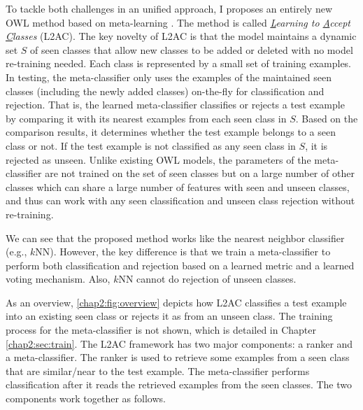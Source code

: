 To tackle both challenges in an unified approach, I proposes an entirely new OWL method based on meta-learning \cite{thrun2012learning,andrychowicz2016learning,fernando2017pathnet,finn2017model,finn2018probabilistic}. The method is called \textit{\underline{L}earning to \underline{A}ccept \underline{C}lasses} (L2AC). The key novelty of L2AC is that the model maintains a dynamic set $S$ of seen classes that allow new classes to be added or deleted with no model re-training needed. Each class is represented by a small set of training examples. In testing, the meta-classifier only uses the examples of the maintained seen classes (including the newly added classes) on-the-fly for classification and rejection. That is, the learned meta-classifier classifies or rejects a test example by comparing it with its nearest examples from each seen class in $S$. Based on the comparison results, it determines whether the test example belongs to a seen class or not. If the test example is not classified as any seen class in $S$, it is rejected as unseen. Unlike existing OWL models, 
the parameters of the meta-classifier are not trained on the set of seen classes but on a large number of other classes which can share a large number of features with seen and unseen classes, and thus can work with any seen classification and unseen class rejection without re-training. 

We can see that the proposed method works like the nearest neighbor classifier (e.g., $k$NN). However, the key difference is that we train a meta-classifier to perform both classification and rejection based on a learned metric and a learned voting mechanism. Also, 
$k$NN cannot do rejection of unseen classes. 

As an overview, \ref{chap2:fig:overview} depicts how L2AC classifies a test example into an existing seen class or rejects it as from an unseen class. The training process for the meta-classifier is not shown, which is detailed in Chapter \ref{chap2:sec:train}. 
The L2AC framework has two major components: a ranker and a meta-classifier. 
The ranker is used to retrieve some examples from a seen class that are similar/near to the test example. The meta-classifier performs classification after it reads the retrieved examples from the seen classes. The two components work together as follows.

